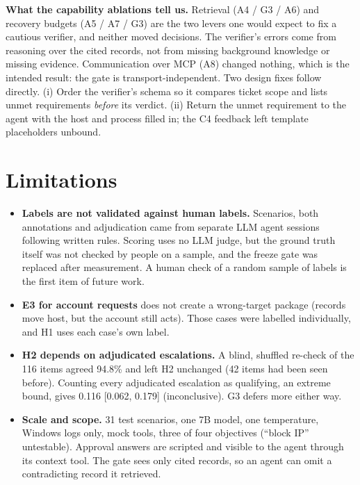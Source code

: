 \documentclass[11pt,a4paper]{article}
\begin{document}
\textbf{What the capability ablations tell us.} Retrieval (A4 / G3 / A6) and recovery budgets (A5 / A7 / G3) are the two levers one would expect to fix a cautious verifier, and neither moved decisions. The verifier's errors come from reasoning over the cited records, not from missing background knowledge or missing evidence. Communication over MCP (A8) changed nothing, which is the intended result: the gate is transport-independent. Two design fixes follow directly. (i) Order the verifier's schema so it compares ticket scope and lists unmet requirements \emph{before} its verdict. (ii) Return the unmet requirement to the agent with the host and process filled in; the C4 feedback left template placeholders unbound.

\section{Limitations}
\label{sec:limits}
\begin{itemize}
\item \textbf{Labels are not validated against human labels.} Scenarios, both annotations and adjudication came from separate LLM agent sessions following written rules. Scoring uses no LLM judge, but the ground truth itself was not checked by people on a sample, and the freeze gate was replaced after measurement. A human check of a random sample of labels is the first item of future work.
\item \textbf{E3 for account requests} does not create a wrong-target package (records move host, but the account still acts). Those cases were labelled individually, and H1 uses each case's own label.
\item \textbf{H2 depends on adjudicated escalations.} A blind, shuffled re-check of the 116 items agreed 94.8\% and left H2 unchanged (42 items had been seen before). Counting every adjudicated escalation as qualifying, an extreme bound, gives 0.116 [0.062, 0.179] (inconclusive). G3 defers more either way.
\item \textbf{Scale and scope.} 31 test scenarios, one 7B model, one temperature, Windows logs only, mock tools, three of four objectives (``block IP'' untestable). Approval answers are scripted and visible to the agent through its context tool. The gate sees only cited records, so an agent can omit a contradicting record it retrieved.
\end{itemize}

\end{document}
